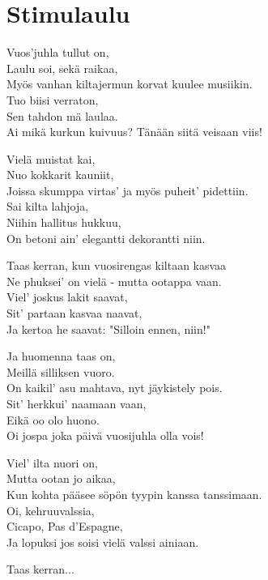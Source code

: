 \section{Stimulaulu}
Vuos'juhla tullut on,\\
Laulu soi, sekä raikaa,\\
Myös vanhan kiltajermun korvat kuulee musiikin.\\
Tuo biisi verraton,\\
Sen tahdon mä laulaa.\\
Ai mikä kurkun kuivuus? Tänään siitä veisaan viis!

Vielä muistat kai,\\
Nuo kokkarit kauniit,\\
Joissa skumppa virtas' ja myös puheit' pidettiin.\\
Sai kilta lahjoja,\\
Niihin hallitus hukkuu,\\
On betoni ain' elegantti dekorantti niin.

Taas kerran, kun vuosirengas kiltaan kasvaa\\
Ne phuksei' on vielä - mutta ootappa vaan.\\
Viel' joskus lakit saavat,\\
Sit' partaan kasvaa naavat,\\
Ja kertoa he saavat: "Silloin ennen, niin!"

Ja huomenna taas on,\\
Meillä silliksen vuoro.\\
On kaikil' asu mahtava, nyt jäykistely pois.\\
Sit' herkkui' naamaan vaan,\\
Eikä oo olo huono.\\
Oi jospa joka päivä vuosijuhla olla vois!

Viel' ilta nuori on,\\
Mutta ootan jo aikaa,\\
Kun kohta pääsee söpön tyypin kanssa tanssimaan.\\
Oi, kehruuvalssia,\\
Cicapo, Pas d'Espagne,\\
Ja lopuksi jos soisi vielä valssi ainiaan.

Taas kerran...
